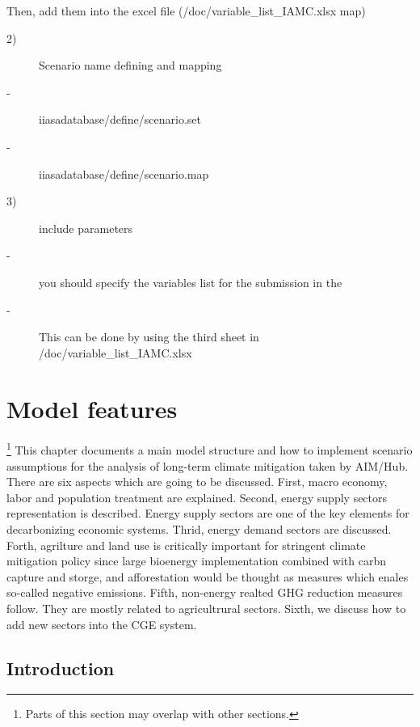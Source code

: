 \documentclass[10pt,a4paper,titlepage,dvipdfmx]{book}
\begin{document}
Then, add them into the excel file (/doc/variable\_list\_IAMC.xlsx map)
\begin{description}
\item[2)]Scenario name defining and mapping
\item[-]iiasadatabase/define/scenario.set
\item[-]iiasadatabase/define/scenario.map
\end{description}

\begin{description}
\item[3)]include parameters
\item[-]you should specify the variables list for the submission in the 
\item[-]This can be done by using the third sheet in /doc/variable\_list\_IAMC.xlsx
\end{description}
\chapter{\label{chp:ModFea}{Model features}}
\footnote{Parts of this section may overlap with other sections.}\label{mark-11.}
This chapter documents a main model structure and how to implement scenario assumptions for the analysis of long-term climate mitigation taken by AIM/Hub. 
There are six aspects which are going to be discussed. First, macro economy, labor and population treatment are explained. Second, energy supply sectors representation is described. 
Energy supply sectors are one of the key elements for decarbonizing economic systems. 
Thrid, energy demand sectors are discussed. 
Forth, agrilture and land use is critically important for stringent climate mitigation policy since large bioenergy implementation combined with carbn capture and storge, and afforestation would be thought as measures which enales so-called negative emissions. 
Fifth, non-energy realted GHG reduction measures follow. They are mostly related to agricultrural sectors. 
Sixth, we discuss how to add new sectors into the CGE system.

\section{\label{sec:SomTIPS-Int}{Introduction}}
\end{document}
